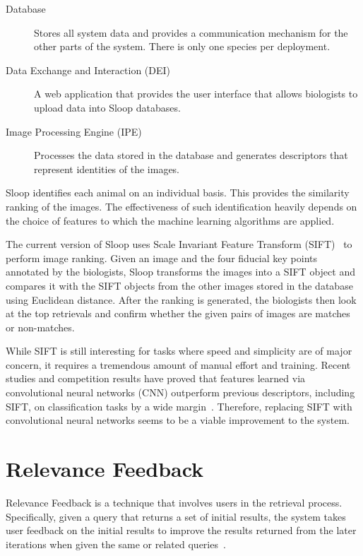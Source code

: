   \begin{description}
      \item[Database] Stores all system data and provides a communication
          mechanism for the other parts of the system. There is only one species
          per deployment.
      \item[Data Exchange and Interaction (DEI)]
      A web application that provides the user interface that allows
      biologists to upload data into Sloop databases.
      \item[Image Processing Engine (IPE)]
      Processes the data stored in the database and generates descriptors
      that represent identities of the images.
  \end{description}

  Sloop identifies each animal on an individual basis. This provides the similarity
  ranking of the images. The effectiveness of such identification heavily
  depends on the choice of features to which the machine learning algorithms are
  applied.

  The current version of Sloop uses Scale Invariant Feature Transform (SIFT)~\cite{lowe04} to
  perform image ranking. Given an image and the four fiducial key points
  annotated by the biologists, Sloop transforms the images into a SIFT object and
  compares it with the SIFT objects from the other images stored in the database using
  Euclidean distance. After the ranking is generated, the biologists then look at
  the top retrievals and confirm whether the given pairs of images are matches or
  non-matches.

  While SIFT is still interesting for tasks where speed and simplicity are of
  major concern, it requires a tremendous amount of manual effort and training.
  Recent studies and competition results have proved that features learned via
  convolutional neural networks (CNN) outperform previous descriptors, including
  SIFT, on classification tasks by a wide margin~\cite{fisher14}. Therefore,
  replacing SIFT with convolutional neural networks seems to be a viable
  improvement to the system.


\section{Relevance Feedback}

Relevance Feedback is a technique that involves users in the retrieval process.
Specifically, given a query that returns a set of initial results, the system
takes user feedback on the initial results to improve the results returned from
the later iterations when given the same or related
queries~\cite{manning2008introduction}.

